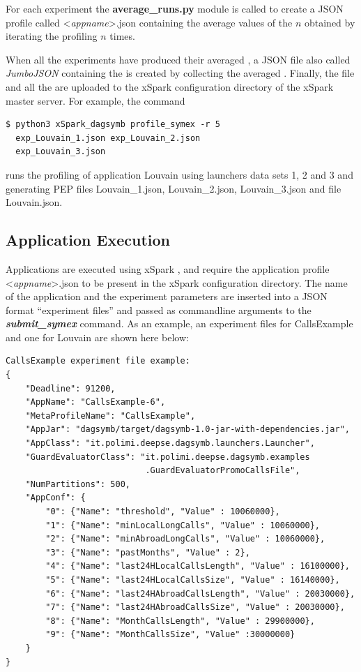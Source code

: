 For each experiment the  \textbf{average\_runs.py} module is called to create a JSON profile called  <\emph{appname}>.json containing the average values of the $n$ \plans obtained by iterating the profiling $n$ times. 

When all the experiments have produced their averaged \plan, a JSON file also called \textit{JumboJSON} containing the \model is created by collecting the averaged \plans. Finally, the \model file and all the \plans are uploaded to the xSpark configuration directory of the xSpark master server. For example, the command
\begin{verbatim} 
$ python3 xSpark_dagsymb profile_symex -r 5
  exp_Louvain_1.json exp_Louvain_2.json 
  exp_Louvain_3.json 
\end{verbatim}
runs the profiling of application Louvain using launchers data sets 1, 2 and 3 and generating PEP files Louvain\_1.json, Louvain\_2.json, Louvain\_3.json and \model file Louvain.json.

\hypertarget{application-execution}{%
\subsection{Application Execution}\label{application-execution}}
Applications are executed using xSpark
, and require the
application profile <\emph{appname}>.json to be present in the
xSpark configuration directory. The name of the application and the experiment
parameters are inserted into a JSON format ``experiment files'' and passed as commandline
arguments to the \emph{\textbf{submit\_symex}} command. As an example, an
experiment files for CallsExample and one for Louvain are shown here below:

\vspace{1cm}
\begin{verbatim}
CallsExample experiment file example:
{
    "Deadline": 91200,
    "AppName": "CallsExample-6",
    "MetaProfileName": "CallsExample",
    "AppJar": "dagsymb/target/dagsymb-1.0-jar-with-dependencies.jar",
    "AppClass": "it.polimi.deepse.dagsymb.launchers.Launcher",
    "GuardEvaluatorClass": "it.polimi.deepse.dagsymb.examples
                            .GuardEvaluatorPromoCallsFile",
    "NumPartitions": 500,
    "AppConf": {
        "0": {"Name": "threshold", "Value" : 10060000},
        "1": {"Name": "minLocalLongCalls", "Value" : 10060000},
        "2": {"Name": "minAbroadLongCalls", "Value" : 10060000},
        "3": {"Name": "pastMonths", "Value" : 2},
        "4": {"Name": "last24HLocalCallsLength", "Value" : 16100000},
        "5": {"Name": "last24HLocalCallsSize", "Value" : 16140000},
        "6": {"Name": "last24HAbroadCallsLength", "Value" : 20030000},
        "7": {"Name": "last24HAbroadCallsSize", "Value" : 20030000},
        "8": {"Name": "MonthCallsLength", "Value" : 29900000},
        "9": {"Name": "MonthCallsSize", "Value" :30000000}
    }
}
\end{verbatim}

